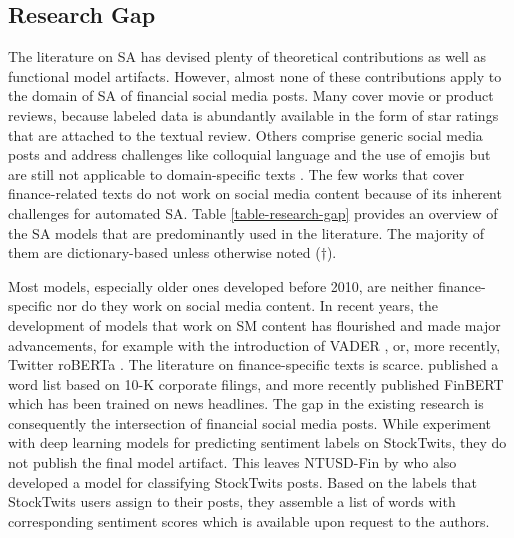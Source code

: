 






\subsection{Research Gap}
\label{section-research-gap}
The literature on SA has devised plenty of theoretical contributions as well as functional model artifacts. However, almost none of these contributions apply to the domain of SA of financial social media posts. Many cover movie or product reviews, because labeled data is abundantly available in the form of star ratings that are attached to the textual review. Others comprise generic social media posts and address challenges like colloquial language and the use of emojis but are still not applicable to domain-specific texts . The few works that cover finance-related texts \cite{loughranMcD2011, araci2019finbert}  do not work on social media content because of its inherent challenges for automated SA. Table \ref{table-research-gap} provides an overview of the SA models that are predominantly used in the literature. The majority of them are dictionary-based unless otherwise noted ($\dagger$).



Most models, especially older ones developed before 2010, are neither finance-specific nor do they work on social media content. In recent years, the development of models that work on SM content has flourished and made major advancements, for example with the introduction of VADER , or, more recently, Twitter roBERTa . The literature on finance-specific texts is scarce.  published a word list based on 10-K corporate filings, and more recently  published FinBERT which has been trained on news headlines. The gap in the existing research is consequently the intersection of financial social media posts. While  experiment with deep learning models for predicting sentiment labels on StockTwits, they do not publish the final model artifact. This leaves NTUSD-Fin by  who also developed a model for classifying StockTwits posts. Based on the labels that StockTwits users assign to their posts, they assemble a list of words with corresponding sentiment scores which is available upon request to the authors.

